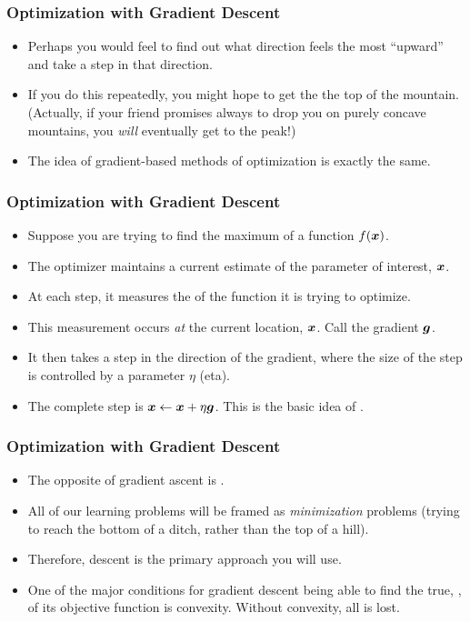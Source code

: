 \documentclass[trans]{beamer}
\begin{document}
\begin{frame}
  \frametitle{Optimization with Gradient Descent}
\begin{itemize}
\item
Perhaps you would feel to find out what direction
feels the most ``upward'' and take a step in that direction. 
\item If you
do this repeatedly, you might hope to get the the top of the mountain.
(Actually, if your friend promises always to drop you on purely
concave mountains, you \emph{will} eventually get to the peak!)
\item
The idea of gradient-based methods of optimization is exactly the
same.
\end{itemize}
\end{frame}

\begin{frame}
  \frametitle{Optimization with Gradient Descent}
\begin{itemize}
\item
  Suppose you are trying to find the maximum of a function
$f({\boldsymbol{x}})$.
\item  The optimizer maintains a current estimate of the parameter
of interest, ${\boldsymbol{x}}$. 
\item At each step, it measures the 
of the function it is trying to optimize. 
\item This measurement occurs
\emph{at} the current location, ${\boldsymbol{x}}$.  Call the gradient ${\boldsymbol{g}}$.
\item  It
then takes a step in the direction of the gradient, where the size of
the step is controlled by a parameter $\eta$ (eta).  
\item The complete step
is ${\boldsymbol{x}} \leftarrow {\boldsymbol{x}} + \eta {\boldsymbol{g}}$.  This is the basic idea of
.
\end{itemize}
\end{frame}

\begin{frame}
  \frametitle{Optimization with Gradient Descent}
\begin{itemize}
\item
The opposite of gradient ascent is .  
\item All of
our learning problems will be framed as \emph{minimization} problems
(trying to reach the bottom of a ditch, rather than the top of a
hill).  
\item Therefore, descent is the primary approach you will use.
\item One of the major conditions for gradient descent being able to find the
true, , of its objective function is
convexity.  Without convexity, all is lost.
\end{itemize}
\end{frame}
\end{document}
